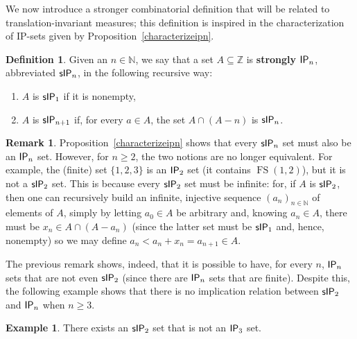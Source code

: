 \documentclass{jloganal}
\theoremstyle{definition}
\newtheorem{defn}[thm]{Definition}    %
\newtheorem{ex}[thm]{Example}
\newtheorem*{rem}{Remark}             %
\DeclareMathOperator{\fs}{FS}
\newcommand{\ip}{\mathnormal{\mathsf{IP}}}
\newcommand{\sip}{\mathnormal{\mathsf{sIP}}}
\begin{document}
We now introduce a stronger combinatorial definition that will be related to translation-invariant measures; this definition is inspired in
the characterization of IP-sets given by Proposition~\ref{characterizeipn}.%

\begin{defn}
    Given an $n\in\mathbb N$, we say that a set $A\subseteq\mathbb Z$ is {\bf strongly $\ip_n$}, abbreviated $\sip_n$, in the following recursive way:
    \begin{enumerate}
        \item $A$ is $\sip_1$ if it is nonempty,
        \item $A$ is $\sip_{n+1}$ if, for every $a\in A$, the set $A\cap(A-n)$ is $\sip_n$.
    \end{enumerate}
\end{defn}

\begin{rem}
    Proposition~\ref{characterizeipn} shows that every $\sip_n$ set must also be an $\ip_n$ set. However, for $n\geq 2$, the two notions are no longer equivalent. For example, the (finite) set $\{1,2,3\}$ is an $\ip_2$ set (it contains $\fs(1,2)$), but it is not a $\sip_2$ set. This is because every $\sip_2$ set must be infinite: for, if $A$ is $\sip_2$, then one can recursively build an infinite, injective sequence $(a_n)_{n\in\mathbb N}$ of elements of $A$, simply by letting $a_0\in A$ be arbitrary and, knowing $a_n\in A$, there must be $x_n\in A\cap(A-a_n)$ (since the latter set must be $\sip_1$ and, hence, nonempty) so we may define $a_n<a_n+x_n=a_{n+1}\in A$.
\end{rem}

The previous remark shows, indeed, that it is possible to have, for every $n$, $\ip_n$ sets that are not even $\sip_2$ (since there are $\ip_n$ sets that are finite). Despite this, the following example shows that there is no implication relation between $\sip_2$ and $\ip_n$ when $n\geq 3$.

\begin{ex}\label{ex:sipnotip}
    There exists an $\sip_2$ set that is not an $\ip_3$ set.
\end{ex}
\end{document}
